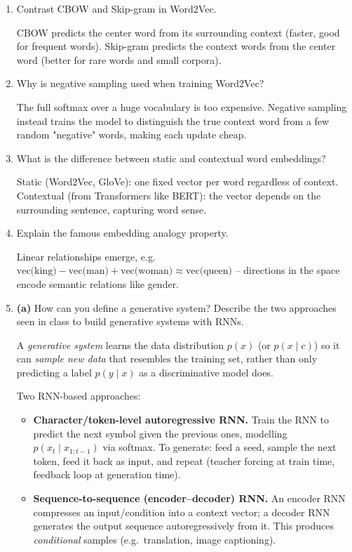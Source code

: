 \documentclass[10pt,a4paper]{article}
\newcommand{\q}[1]{\item #1}
\begin{document}
\begin{enumerate}[leftmargin=*,label=\textbf{Q\arabic*.}]

\q Contrast CBOW and Skip-gram in Word2Vec.
\begin{answerbox}
CBOW predicts the center word from its surrounding context (faster, good for frequent words). Skip-gram predicts the context words from the center word (better for rare words and small corpora).
\end{answerbox}

\q Why is negative sampling used when training Word2Vec?
\begin{answerbox}
The full softmax over a huge vocabulary is too expensive. Negative sampling instead trains the model to distinguish the true context word from a few random "negative" words, making each update cheap.
\end{answerbox}

\q What is the difference between static and contextual word embeddings?
\begin{answerbox}
Static (Word2Vec, GloVe): one fixed vector per word regardless of context. Contextual (from Transformers like BERT): the vector depends on the surrounding sentence, capturing word sense.
\end{answerbox}

\q Explain the famous embedding analogy property.
\begin{answerbox}
Linear relationships emerge, e.g.\ $\text{vec(king)}-\text{vec(man)}+\text{vec(woman)}\approx\text{vec(queen)}$ -- directions in the space encode semantic relations like gender.
\end{answerbox}

\q \textbf{(a)} How can you define a generative system? Describe the two approaches seen in class to build generative systems with RNNs.
\begin{answerbox}
A \emph{generative system} learns the data distribution $p(x)$ (or $p(x\mid c)$) so it can \emph{sample new data} that resembles the training set, rather than only predicting a label $p(y\mid x)$ as a discriminative model does.

Two RNN-based approaches:
\begin{itemize}[leftmargin=*,nosep]
\item \textbf{Character/token-level autoregressive RNN.} Train the RNN to predict the next symbol given the previous ones, modelling $p(x_t\mid x_{1:t-1})$ via softmax. To generate: feed a seed, sample the next token, feed it back as input, and repeat (teacher forcing at train time, feedback loop at generation time).
\item \textbf{Sequence-to-sequence (encoder--decoder) RNN.} An encoder RNN compresses an input/condition into a context vector; a decoder RNN generates the output sequence autoregressively from it. This produces \emph{conditional} samples (e.g.\ translation, image captioning).
\end{itemize}
\end{answerbox}


\end{enumerate}
\end{document}
